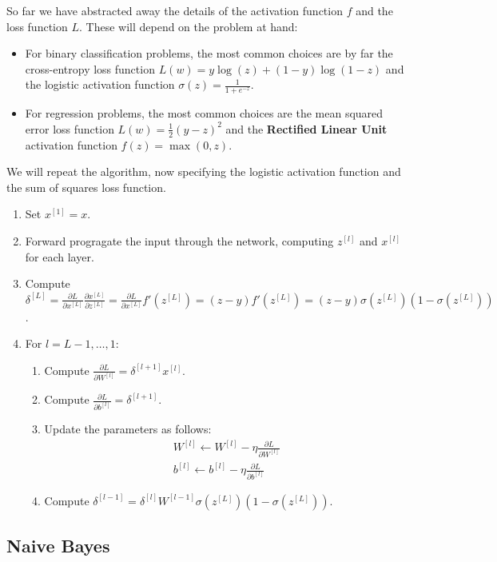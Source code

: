 \documentclass{article}
\begin{document}
So far we have abstracted away the details of the activation function $f$ and the loss function $L$.
These will depend on the problem at hand:
\begin{itemize}
\item For binary classification problems, the most common choices are by far the cross-entropy loss function $L(w) = y \log(z) + (1-y) \log(1-z)$ and the logistic activation function $\sigma(z) = \frac{1}{1+e^{-z}}$.
\item For regression problems, the most common choices are the mean squared error loss function $L(w) = \frac{1}{2} (y-z)^2$ and the \textbf{Rectified Linear Unit} activation function $f(z) = \max(0,z)$.
\end{itemize}

We will repeat the algorithm, now specifying the logistic activation function and the sum of squares loss function.
\begin{enumerate}
\item Set $x^{[1]} = x$.
\item Forward progragate the input through the network, computing $z^{[l]}$ and $x^{[l]}$ for each layer.
\item Compute $\delta^{[L]} = \frac{\partial L}{\partial x^{[L]}} \frac{\partial x^{[L]}}{\partial z^{[L]}} = \frac{\partial L}{\partial x^{[L]}} f'(z^{[L]}) = (z-y) f'(z^{[L]}) = (z-y) \sigma(z^{[L]})(1-\sigma(z^{[L]}))$.
\item For $l = L-1, \dots, 1$:
\begin{enumerate}
\item Compute $\frac{\partial L}{\partial W^{[l]}} = \delta^{[l+1]} x^{[l]}$.
\item Compute $\frac{\partial L}{\partial b^{[l]}} = \delta^{[l+1]}$.
\item Update the parameters as follows:
\begin{gather*}
W^{[l]} \leftarrow W^{[l]} - \eta \frac{\partial L}{\partial W^{[l]}} \\
b^{[l]} \leftarrow b^{[l]} - \eta \frac{\partial L}{\partial b^{[l]}}
\end{gather*}
\item Compute $\delta^{[l-1]} = \delta^{[l]} W^{[l-1]} \sigma(z^{[L]})(1-\sigma(z^{[L]}))$.
\end{enumerate}
\end{enumerate}

\subsection{Naive Bayes}
\end{document}

